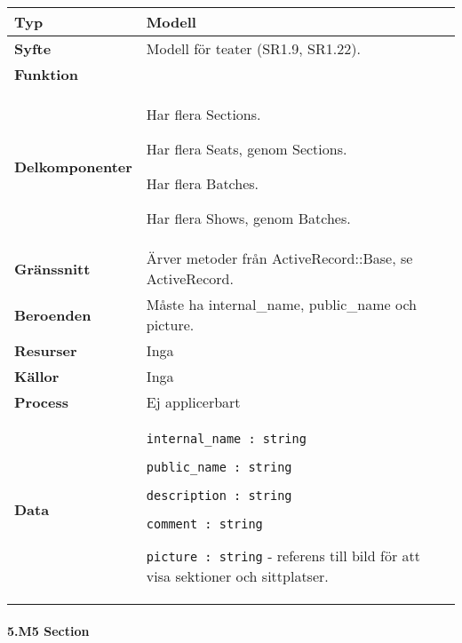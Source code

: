 \documentclass[a4paper, twoside, 11pt, titlepage]{article}
\begin{document}
			\begin {table} [ht] \begin{tabular} {  p{3.5cm} p{11.6cm} }
				\hline
				{\sffamily\textbf{Typ}} & {Modell} \\
				\hline
				{\sffamily\textbf{Syfte}} & {Modell för teater (SR1.9, SR1.22).} \\
				\hline
				{\sffamily\textbf{Funktion}} & { } \\
				\hline
				{\sffamily\textbf{Delkomponenter}} & {Har flera Sections.

Har flera Seats, genom Sections.

Har flera Batches.

Har flera Shows, genom Batches.} \\
				\hline
				{\sffamily\textbf{Gränssnitt}} & {Ärver metoder från ActiveRecord::Base, se ActiveRecord.} \\
				\hline
				{\sffamily\textbf{Beroenden}} & {Måste ha internal\_name, public\_name och picture.} \\
				\hline
				{\sffamily\textbf{Resurser}} & {Inga} \\
				\hline
				{\sffamily\textbf{Källor}} & {Inga} \\
				\hline
				{\sffamily\textbf{Process}} & {Ej applicerbart} \\
				\hline
				{\sffamily\textbf{Data}} & {{\tt internal\_name : string}

{\tt public\_name : string}

{\tt description : string}

{\tt comment : string}

{\tt picture : string} - referens till bild för att visa sektioner och sittplatser.} \\
				\hline
			\end{tabular} \end{table} \FloatBarrier


			\paragraph{5.M5 Section}\
\end{document}
